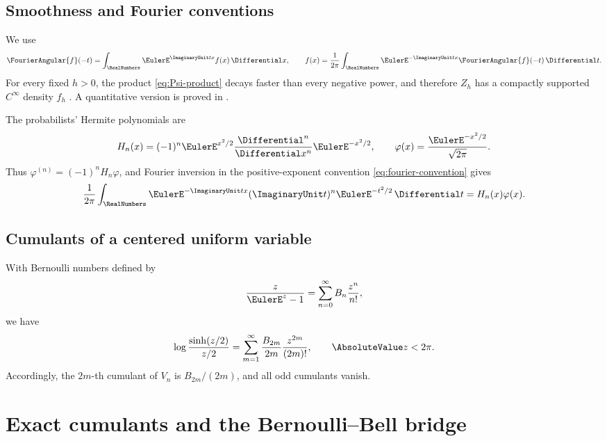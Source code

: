 \documentclass[11pt]{article}
\numberwithin{equation}{section}
\theoremstyle{definition}
\newcommand{\phiN}{\varphi}
\begin{document}
\subsection{Smoothness and Fourier conventions}
We use
\begin{equation}\label{eq:fourier-convention}
 \FourierAngular{f}(-t)=\int_{\RealNumbers}\EulerE^{\ImaginaryUnit tx}f(x)\,\Differential x,
 \qquad
 f(x)=\frac1{2\pi}\int_{\RealNumbers}\EulerE^{-\ImaginaryUnit tx}\FourierAngular{f}(-t)\,\Differential t.
\end{equation}
For every fixed \(h>0\), the product \eqref{eq:Psi-product} decays faster than every negative power, and therefore \(Z_h\) has a compactly supported \(C^\infty\) density \(f_h\) \cite{JessenWintner,Arias1982}.  A quantitative version is proved in .

The probabilists' Hermite polynomials are
\begin{equation}\label{eq:Hermite}
 H_n(x)=(-1)^n\EulerE^{x^2/2}\frac{\Differential^n}{\Differential x^n}\EulerE^{-x^2/2},
 \qquad
 \phiN(x)=\frac{\EulerE^{-x^2/2}}{\sqrt{2\pi}}.
\end{equation}
Thus \(\phiN^{(n)}=(-1)^nH_n\phiN\), and Fourier inversion in the
positive-exponent convention \eqref{eq:fourier-convention} gives
\begin{equation}\label{eq:hermite-inversion}
 \frac{1}{2\pi}\int_{\RealNumbers}
 \EulerE^{-\ImaginaryUnit tx}(\ImaginaryUnit t)^n\EulerE^{-t^2/2}\,\Differential t
 =H_n(x)\phiN(x).
\end{equation}

\subsection{Cumulants of a centered uniform variable}
With Bernoulli numbers defined by
\begin{equation}\label{eq:bernoulli-generating}
 \frac{z}{\EulerE^z-1}=\sum_{n=0}^{\infty}B_n\frac{z^n}{n!},
\end{equation}
we have
\begin{equation}\label{eq:uniform-cumulants}
 \log\frac{\sinh(z/2)}{z/2}
 =\sum_{m=1}^{\infty}\frac{B_{2m}}{2m}\frac{z^{2m}}{(2m)!},
 \qquad \AbsoluteValue z<2\pi.
\end{equation}
Accordingly, the \(2m\)-th cumulant of \(V_n\) is \(B_{2m}/(2m)\), and all odd cumulants vanish.

\section{Exact cumulants and the Bernoulli--Bell bridge}\label{sec:cumulants}
\end{document}
